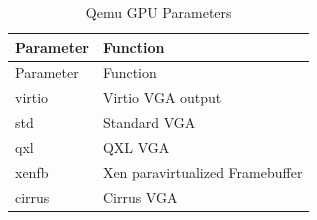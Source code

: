 \documentclass[
  14pt,
  english,
  a4paper,
]{scrreprt}
\begin{document}
\hypertarget{tbl:qemu_gpu_param}{}
\begin{longtable}[]{@{}ll@{}}
\caption{\label{tbl:qemu_gpu_param}Qemu GPU Parameters}\tabularnewline
\toprule
\begin{minipage}[b]{0.16\columnwidth}\raggedright
Parameter\strut
\end{minipage} & \begin{minipage}[b]{0.44\columnwidth}\raggedright
Function\strut
\end{minipage}\tabularnewline
\midrule
\endfirsthead
\toprule
\begin{minipage}[b]{0.16\columnwidth}\raggedright
Parameter\strut
\end{minipage} & \begin{minipage}[b]{0.44\columnwidth}\raggedright
Function\strut
\end{minipage}\tabularnewline
\midrule
\endhead
\begin{minipage}[t]{0.16\columnwidth}\raggedright
virtio\strut
\end{minipage} & \begin{minipage}[t]{0.44\columnwidth}\raggedright
Virtio VGA output\strut
\end{minipage}\tabularnewline
\begin{minipage}[t]{0.16\columnwidth}\raggedright
std\strut
\end{minipage} & \begin{minipage}[t]{0.44\columnwidth}\raggedright
Standard VGA\strut
\end{minipage}\tabularnewline
\begin{minipage}[t]{0.16\columnwidth}\raggedright
qxl\strut
\end{minipage} & \begin{minipage}[t]{0.44\columnwidth}\raggedright
QXL VGA\strut
\end{minipage}\tabularnewline
\begin{minipage}[t]{0.16\columnwidth}\raggedright
xenfb\strut
\end{minipage} & \begin{minipage}[t]{0.44\columnwidth}\raggedright
Xen paravirtualized Framebuffer\strut
\end{minipage}\tabularnewline
\begin{minipage}[t]{0.16\columnwidth}\raggedright
cirrus\strut
\end{minipage} & \begin{minipage}[t]{0.44\columnwidth}\raggedright
Cirrus VGA\strut
\end{minipage}\tabularnewline

\end{longtable}
\end{document}
